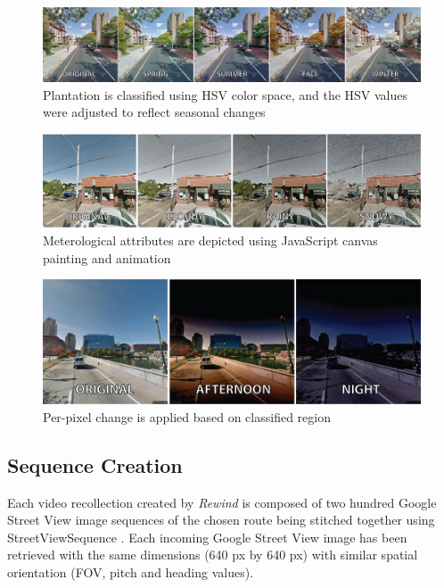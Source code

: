 \documentclass{sigchi}
\begin{document}
\begin{figure}
	\centering
	\includegraphics[width=\textwidth]{Rewind-seasons2}
	\caption{Plantation is classified using HSV color space, and the HSV values were adjusted to reflect seasonal changes}
	\label{fig:season}
\end{figure}


\begin{figure}
	\centering
	\includegraphics[width=\textwidth]{Rewind-weather}
	\caption{Meterological attributes are depicted using JavaScript canvas painting and animation}
	\label{fig:weather}
\end{figure}

\begin{figure}
	\centering
	\includegraphics[width=1\linewidth]{Rewind-time_of_day2}
	\caption{Per-pixel change is applied based on classified region}
	\label{fig:timeofday}
\end{figure}

\subsection{Sequence Creation}
Each video recollection created by \textit{Rewind} is composed of two hundred Google Street View image sequences of the chosen route being stitched together using StreetViewSequence \cite{streetviewsequence}. Each incoming Google Street View image has been retrieved with the same dimensions (640 px by 640 px) with similar spatial orientation (FOV, pitch and heading values).
\end{document}
